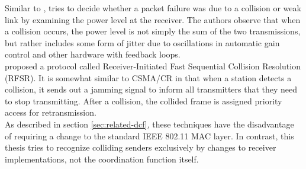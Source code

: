 Similar to \cite{zhu2016}, \cite{chua2016} tries to decide whether a packet failure was due to a collision or weak link by examining the power level at the receiver. The authors observe that when a collision occurs, the power level is not simply the sum of the two transmissions, but rather includes some form of jitter due to oscillations in automatic gain control and other hardware with feedback loops.\\

\cite{jibukumar2015} proposed a protocol called Receiver-Initiated Fast Sequential Collision Resolution (RFSR). It is somewhat similar to CSMA/CR \cite{choi2013} in that when a station detects a collision, it sends out a jamming signal to inform all transmitters that they need to stop transmitting. After a collision, the collided frame is assigned priority access for retransmission.\\

As described in section \ref{sec:related-dcf}, these techniques have the disadvantage of requiring a change to the standard IEEE 802.11 \gls{MAC} layer. In contrast, this thesis tries to recognize colliding senders exclusively by changes to receiver implementations, not the coordination function itself.
